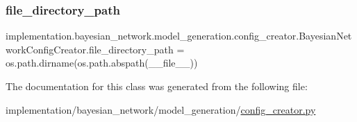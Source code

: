 \subsubsection{\texorpdfstring{file\+\_\+directory\+\_\+path}{file\_directory\_path}}
{\footnotesize\ttfamily implementation.\+bayesian\+\_\+network.\+model\+\_\+generation.\+config\+\_\+creator.\+Bayesian\+Network\+Config\+Creator.\+file\+\_\+directory\+\_\+path = os.\+path.\+dirname(os.\+path.\+abspath(\+\_\+\+\_\+file\+\_\+\+\_\+))\hspace{0.3cm}{\ttfamily [static]}}



The documentation for this class was generated from the following file\+:\begin{DoxyCompactItemize}
\item 
implementation/bayesian\+\_\+network/model\+\_\+generation/\hyperlink{config__creator_8py}{config\+\_\+creator.\+py}\end{DoxyCompactItemize}
